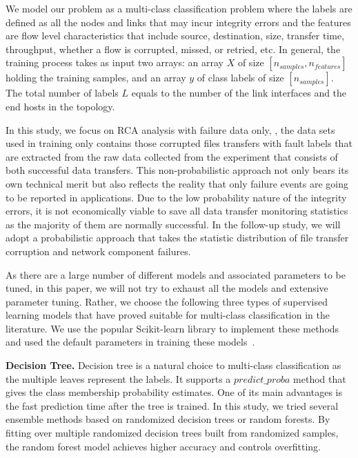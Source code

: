 We model our problem as a multi-class classification problem where the labels are defined as all the nodes and links that may incur integrity errors and the features are flow level characteristics that include source, destination, size, transfer time, throughput, whether a flow is corrupted, missed, or retried, etc. In general, the training process takes as input two arrays: an array $X$ of size $[n_{samples}, n_{features}]$ holding the training samples, and an array $y$ of class labels of size $[n_{samples}]$. The total number of labels $L$ equals to the number of the link interfaces and the end hosts in the topology.

In this study, we focus on RCA analysis with failure data only, \ie, the data sets used in training only contains those corrupted files transfers with fault labels that are extracted from the raw data collected from the experiment that consists of both successful data transfers. This non-probabilistic approach not only bears its own technical merit but also reflects the reality that only failure events are going to be reported in applications. Due to the low probability nature of the integrity errors, it is not economically viable to save all data transfer monitoring statistics as the majority of them are normally successful. In the follow-up study, we will adopt a probabilistic approach that takes the statistic distribution of file transfer corruption and network component failures.      

As there are a large number of different models and associated parameters to be tuned, in this paper, we will not try to exhaust all the models and extensive parameter tuning. Rather, we choose the following three types of supervised learning models that have proved suitable for multi-class classification in the literature. We use the popular Scikit-learn library to implement these methods and used the default parameters in training these models~\cite{Scikit:web}. 

{\bf Decision Tree.}  Decision tree is a natural choice to multi-class classification as the multiple leaves represent the labels. It supports a $predict\_proba$ method that gives the class membership probability estimates. One of its main advantages is the fast prediction time after the tree is trained. In this study, we tried several ensemble methods based on randomized decision trees or random forests. By fitting over multiple randomized decision trees built from randomized samples, the random forest model achieves higher accuracy and controls overfitting. 

